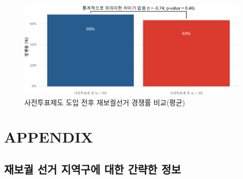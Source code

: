 \documentclass[
  11pt,
  letter]{article}
\begin{document}
\begin{figure}
\centering
\includegraphics{Codebook_national_files/figure-latex/unnamed-chunk-20-1.pdf}
\caption{사전투표제도 도입 전후 재보궐선거 경쟁률 비교(평균)}
\end{figure}

\newpage

\hypertarget{appendix}{%
\section{APPENDIX}\label{appendix}}

\hypertarget{uxc7acuxbcf4uxad90-uxc120uxac70-uxc9c0uxc5eduxad6cuxc5d0-uxb300uxd55c-uxac04uxb7b5uxd55c-uxc815uxbcf4}{%
\subsection{재보궐 선거 지역구에 대한 간략한
정보}\label{uxc7acuxbcf4uxad90-uxc120uxac70-uxc9c0uxc5eduxad6cuxc5d0-uxb300uxd55c-uxac04uxb7b5uxd55c-uxc815uxbcf4}}
\end{document}
